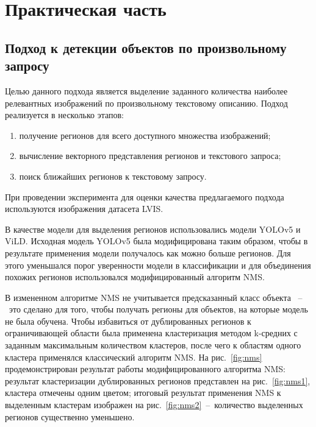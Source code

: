 \documentclass[a4paper,14pt]{article}
\begin{document}
    \newpage


    \section{Практическая часть}

    \subsection{Подход к детекции объектов по произвольному запросу}

    Целью данного подхода является выделение заданного количества наиболее релевантных изображений по произвольному текстовому описанию.
    Подход реализуется в несколько этапов:
    \begin{enumerate}
        [1)]
        \itemsep0em
        \item получение регионов для всего доступного множества изображений;
        \item вычисление векторного представления регионов и текстового запроса;
        \item поиск ближайших регионов к текстовому запросу.
    \end{enumerate}

    При проведении эксперимента для оценки качества предлагаемого подхода используются изображения датасета LVIS.

    В качестве модели для выделения регионов использовались модели YOLOv5 и ViLD.
    Исходная модель YOLOv5 была модифицирована таким образом, чтобы в результате применения модели получалось как можно больше регионов.
    Для этого уменьшался порог уверенности модели в классификации и для объединения похожих регионов использовался модифицированный алгоритм NMS.

    В измененном алгоритме NMS не учитывается предсказанный класс объекта ~--~это сделано для того, чтобы получать регионы для объектов, на которые модель не была обучена.
    Чтобы избавиться от дублированных регионов к ограничивающей области была применена кластеризация методом k-средних с заданным максимальным количеством кластеров, после чего к областям одного кластера применялся классический алгоритм NMS.
    На рис.~\ref{fig:nms} продемонстрирован результат работы модифицированного алгоритма NMS: результат кластеризации дублированных регионов представлен на рис.~\ref{fig:nms1}, кластера отмечены одним цветом; итоговый результат применения NMS к выделенным кластерам изображен на рис.~\ref{fig:nms2}~--~количество выделенных регионов существенно уменьшено.
\end{document}
